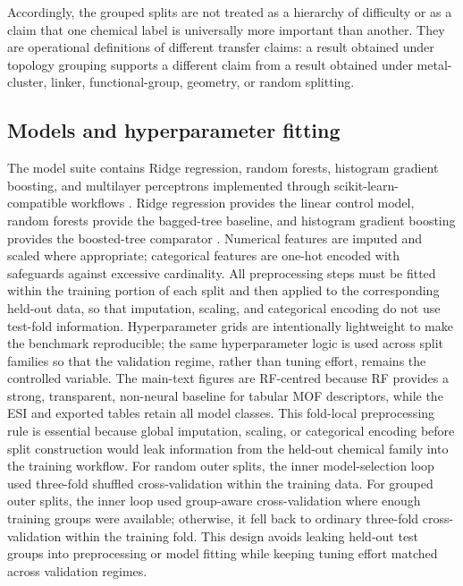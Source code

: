 \documentclass[11pt,a4paper]{article}
\begin{document}
Accordingly, the grouped splits are not treated as a hierarchy of difficulty or as a claim that one chemical label is universally more important than another. They are operational definitions of different transfer claims: a result obtained under topology grouping supports a different claim from a result obtained under metal-cluster, linker, functional-group, geometry, or random splitting.


\subsection*{Models and hyperparameter fitting}
The model suite contains Ridge regression, random forests, histogram gradient boosting, and multilayer perceptrons implemented through scikit-learn-compatible workflows \citep{Pedregosa2011ScikitLearn}. Ridge regression provides the linear control model, random forests provide the bagged-tree baseline, and histogram gradient boosting provides the boosted-tree comparator \citep{Hoerl1970Ridge,Breiman2001RandomForests,Friedman2001GreedyFunction}. Numerical features are imputed and scaled where appropriate; categorical features are one-hot encoded with safeguards against excessive cardinality. All preprocessing steps must be fitted within the training portion of each split and then applied to the corresponding held-out data, so that imputation, scaling, and categorical encoding do not use test-fold information. Hyperparameter grids are intentionally lightweight to make the benchmark reproducible; the same hyperparameter logic is used across split families so that the validation regime, rather than tuning effort, remains the controlled variable. The main-text figures are RF-centred because RF provides a strong, transparent, non-neural baseline for tabular MOF descriptors, while the ESI and exported tables retain all model classes. This fold-local preprocessing rule is essential because global imputation, scaling, or categorical encoding before split construction would leak information from the held-out chemical family into the training workflow. For random outer splits, the inner model-selection loop used three-fold shuffled cross-validation within the training data. For grouped outer splits, the inner loop used group-aware cross-validation where enough training groups were available; otherwise, it fell back to ordinary three-fold cross-validation within the training fold. This design avoids leaking held-out test groups into preprocessing or model fitting while keeping tuning effort matched across validation regimes.
\end{document}
